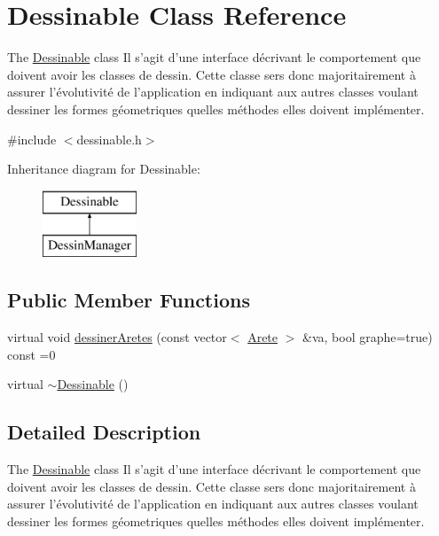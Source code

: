 \hypertarget{class_dessinable}{\section{Dessinable Class Reference}
\label{class_dessinable}
}


The \hyperlink{class_dessinable}{Dessinable} class Il s'agit d'une interface décrivant le comportement que doivent avoir les classes de dessin. Cette classe sers donc majoritairement à assurer l'évolutivité de l'application en indiquant aux autres classes voulant dessiner les formes géometriques quelles méthodes elles doivent implémenter.  




{\ttfamily \#include $<$dessinable.\+h$>$}

Inheritance diagram for Dessinable\+:\begin{figure}[H]
\begin{center}
\leavevmode
\includegraphics[height=2.000000cm]{class_dessinable}
\end{center}
\end{figure}
\subsection*{Public Member Functions}
\begin{DoxyCompactItemize}
\item 
virtual void \hyperlink{class_dessinable_a8e19f229f68063ba9a5164ef269d294d}{dessiner\+Aretes} (const vector$<$ \hyperlink{class_arete}{Arete} $>$ \&va, bool graphe=true) const =0
\item 
virtual \hyperlink{class_dessinable_a36e721321d1ba4324f446445793e7100}{$\sim$\+Dessinable} ()
\end{DoxyCompactItemize}


\subsection{Detailed Description}
The \hyperlink{class_dessinable}{Dessinable} class Il s'agit d'une interface décrivant le comportement que doivent avoir les classes de dessin. Cette classe sers donc majoritairement à assurer l'évolutivité de l'application en indiquant aux autres classes voulant dessiner les formes géometriques quelles méthodes elles doivent implémenter. 

